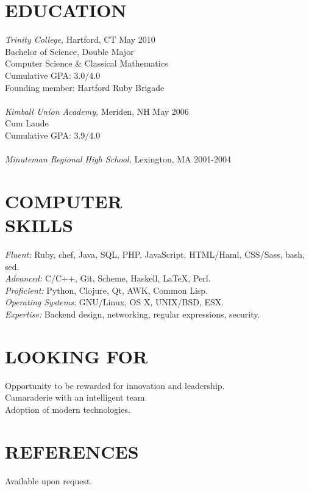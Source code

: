 \documentclass[line,margin]{res}
\begin{document}
\begin{resume}
\section{EDUCATION}
  {\sl Trinity College,}
  Hartford, CT \hfill May 2010 \\
  Bachelor of Science, Double Major \\
  Computer Science \& Classical Mathematics \\
  Cumulative GPA: 3.0/4.0 \\
  Founding member: Hartford Ruby Brigade \\
  \\
  {\sl Kimball Union Academy,}
  Meriden, NH \hfill May 2006 \\
  Cum Laude \\
  Cumulative GPA: 3.9/4.0 \\
  \\
  {\sl Minuteman Regional High School,}
  Lexington, MA \hfill 2001-2004

\section{COMPUTER \\ SKILLS}
  {\sl Fluent:}
  Ruby,
  chef,
  Java,
  SQL,
  PHP,
  JavaScript,
  HTML/Haml,
  CSS/Sass,
  bash,
  sed.
  \\
  {\sl Advanced:}
  C/C++,
  Git,
  Scheme,
  Haskell,
  \LaTeX,
  Perl.
  \\
  {\sl Proficient:}
  Python,
  Clojure,
  Qt,
  AWK,
  Common Lisp.
  \\
  {\sl Operating Systems:}
  GNU/Linux, OS X, UNIX/BSD, ESX.
  \\
  {\sl Expertise:}
  Backend design,
  networking,
  regular expressions,
  security.

\section{LOOKING FOR}
  Opportunity to be rewarded for innovation and leadership. \\
  Camaraderie with an intelligent team. \\
  Adoption of modern technologies.

\section{REFERENCES}
  Available upon request.

\end{resume}
\end{document}
